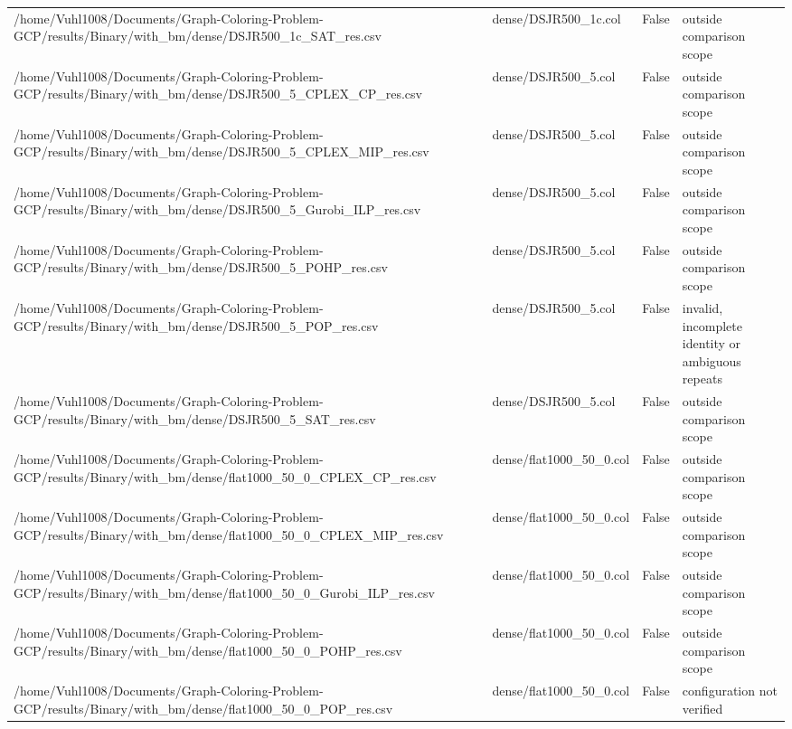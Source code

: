 \begin{table}[htbp]
\begin{tabular}{llll}
/home/Vuhl1008/Documents/Graph-Coloring-Problem-GCP/results/Binary/with\_bm/dense/DSJR500\_1c\_SAT\_res.csv & dense/DSJR500\_1c.col & False & outside comparison scope \\
/home/Vuhl1008/Documents/Graph-Coloring-Problem-GCP/results/Binary/with\_bm/dense/DSJR500\_5\_CPLEX\_CP\_res.csv & dense/DSJR500\_5.col & False & outside comparison scope \\
/home/Vuhl1008/Documents/Graph-Coloring-Problem-GCP/results/Binary/with\_bm/dense/DSJR500\_5\_CPLEX\_MIP\_res.csv & dense/DSJR500\_5.col & False & outside comparison scope \\
/home/Vuhl1008/Documents/Graph-Coloring-Problem-GCP/results/Binary/with\_bm/dense/DSJR500\_5\_Gurobi\_ILP\_res.csv & dense/DSJR500\_5.col & False & outside comparison scope \\
/home/Vuhl1008/Documents/Graph-Coloring-Problem-GCP/results/Binary/with\_bm/dense/DSJR500\_5\_POHP\_res.csv & dense/DSJR500\_5.col & False & outside comparison scope \\
/home/Vuhl1008/Documents/Graph-Coloring-Problem-GCP/results/Binary/with\_bm/dense/DSJR500\_5\_POP\_res.csv & dense/DSJR500\_5.col & False & invalid, incomplete identity or ambiguous repeats \\
/home/Vuhl1008/Documents/Graph-Coloring-Problem-GCP/results/Binary/with\_bm/dense/DSJR500\_5\_SAT\_res.csv & dense/DSJR500\_5.col & False & outside comparison scope \\
/home/Vuhl1008/Documents/Graph-Coloring-Problem-GCP/results/Binary/with\_bm/dense/flat1000\_50\_0\_CPLEX\_CP\_res.csv & dense/flat1000\_50\_0.col & False & outside comparison scope \\
/home/Vuhl1008/Documents/Graph-Coloring-Problem-GCP/results/Binary/with\_bm/dense/flat1000\_50\_0\_CPLEX\_MIP\_res.csv & dense/flat1000\_50\_0.col & False & outside comparison scope \\
/home/Vuhl1008/Documents/Graph-Coloring-Problem-GCP/results/Binary/with\_bm/dense/flat1000\_50\_0\_Gurobi\_ILP\_res.csv & dense/flat1000\_50\_0.col & False & outside comparison scope \\
/home/Vuhl1008/Documents/Graph-Coloring-Problem-GCP/results/Binary/with\_bm/dense/flat1000\_50\_0\_POHP\_res.csv & dense/flat1000\_50\_0.col & False & outside comparison scope \\
/home/Vuhl1008/Documents/Graph-Coloring-Problem-GCP/results/Binary/with\_bm/dense/flat1000\_50\_0\_POP\_res.csv & dense/flat1000\_50\_0.col & False & configuration not verified \\

\end{tabular}
\end{table}
